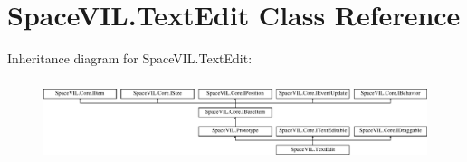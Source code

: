 \hypertarget{class_space_v_i_l_1_1_text_edit}{}\section{Space\+V\+I\+L.\+Text\+Edit Class Reference}
\label{class_space_v_i_l_1_1_text_edit}
Inheritance diagram for Space\+V\+I\+L.\+Text\+Edit\+:\begin{figure}[H]
\begin{center}
\leavevmode
\includegraphics[height=2.421622cm]{class_space_v_i_l_1_1_text_edit}
\end{center}
\end{figure}
